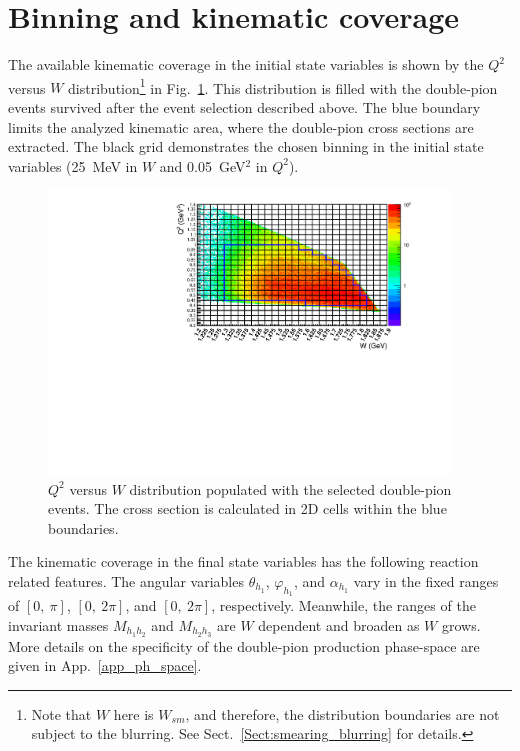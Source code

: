 \section{Binning and kinematic coverage}
\label{Sect:binning}

The available kinematic coverage in the initial state variables is shown by the $Q^2$ versus $W$ distribution\footnote[7]{Note that $W$ here is $W_{sm}$, and therefore, the distribution boundaries are not subject to the blurring. See Sect.~\ref{Sect:smearing_blurring} for details.} in Fig.~\ref{fig:q2_vs_w}. This distribution is filled with the double-pion events survived after the event selection described above. The blue boundary limits the analyzed kinematic area, where the double-pion cross sections are extracted. The black grid demonstrates the chosen binning in the initial state variables (25~MeV in $W$ and 0.05~GeV$^{2}$ in $Q^{2}$).



\begin{figure}[htp]
\begin{center}
\includegraphics[width=0.95\textwidth]{pictures/cross_section/q2vsw_new.pdf}
\caption{\small $Q^2$ versus $W$ distribution populated with the selected double-pion events. The cross section is calculated in 2D cells within the blue boundaries.} \label{fig:q2_vs_w}
\end{center}
\end{figure}

The kinematic coverage in the final state variables has the following reaction related features. The angular variables $\theta_{h_{1}}$, $\varphi_{h_{1}}$, and $\alpha_{h_{1}}$ vary in the fixed ranges of $[0,~\pi]$, $[0,~2\pi]$, and $[0,~2\pi]$, respectively. Meanwhile, the ranges of the invariant masses $M_{h_{1}h_{2}}$ and $M_{h_{2}h_{3}}$ are $W$ dependent and broaden as $W$ grows. More details on the specificity of the double-pion production phase-space are given in App.~\ref{app_ph_space}. 

